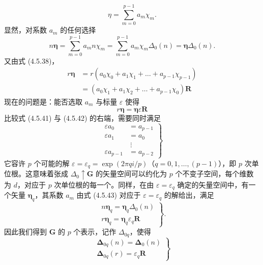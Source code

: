 \begin{equation*}
\eta = \sum^{p-1}_{m=0}a_{m}\chi_{m}.
\tag{4.5.39}
\end{equation*}
显然，对系数 $a_{m}$ 的任何选择
\begin{equation*}
n\boldsymbol{\eta} = \sum^{p-1}_{m=0}a_{m}n\chi_{m} = \sum^{p-1}_{m=0}a_{m}\chi_{m}\Delta_{0}(n) = \boldsymbol{\eta}\Delta_{0}(n).
\tag{4.5.40}
\end{equation*}
又由式 (4.5.38)，
\begin{equation*}
\begin{aligned}
r\boldsymbol{\eta} &= r(a_{0}\chi_{0} + a_{1}\chi_{1} + \dots + a_{p-1}\chi_{p-1})\\
&= (a_{0}\chi_{1} + a_{1}\chi_{2} + \dots + a_{p-1}\chi_{0})\mathbf{R}
\end{aligned}
\tag{4.5.41}
\end{equation*}
现在的问题是：能否选取 $a_{m}$ 与标量 $\varepsilon$ 使得
\begin{equation*}
r\boldsymbol{\eta} = \boldsymbol{\eta}\varepsilon\mathbf{R}
\tag{4.5.42}
\end{equation*}
比较式 (4.5.41) 与 (4.5.42) 的右端，需要同时满足
\begin{equation*}
\left.
\begin{array}{rl}
\varepsilon a_{0} &= a_{p-1}\\
\varepsilon a_{1} &= a_{0}\\
&\ \vdots\\
\varepsilon a_{p-1} &= a_{p-2}
\end{array}
\right\}
\tag{4.5.43}
\end{equation*}
它容许 $p$ 个可能的解 $\varepsilon = \varepsilon_{q} = \exp(2\pi qi/p)$（$q = 0, 1, \dots, (p-1)$），即 $p$ 次单位根。这意味着张成 $\Delta_{0} \uparrow \mathbf{G}$ 的矢量空间可以约化为 $p$ 个不变子空间，每个维数为 $d$，对应于 $p$ 次单位根的每一个。同样，在由 $\varepsilon = \varepsilon_{q}$ 确定的矢量空间中，有一个矢量 $\boldsymbol{\eta}_{q}$，其系数 $a_{m}$ 由式 (4.5.43) 对应于 $\varepsilon = \varepsilon_{q}$ 的解给出，满足
\begin{equation*}
\left.
\begin{array}{l}
n\boldsymbol{\eta}_{q} = \boldsymbol{\eta}_{q}\Delta_{0}(n)\\
r\boldsymbol{\eta}_{q} = \boldsymbol{\eta}_{q}\varepsilon_{q}\mathbf{R}
\end{array}
\right\}.
\tag{4.5.44}
\end{equation*}
因此我们得到 $\mathbf{G}$ 的 $p$ 个表示，记作 $\Delta_{0q}$，使得
\begin{equation*}
\left.
\begin{array}{l}
\boldsymbol{\Delta}_{0q}(n) = \boldsymbol{\Delta}_{0}(n)\\
\boldsymbol{\Delta}_{0q}(r) = \varepsilon_{q}\mathbf{R}
\end{array}
\right\}
\tag{4.5.45}
\end{equation*}
